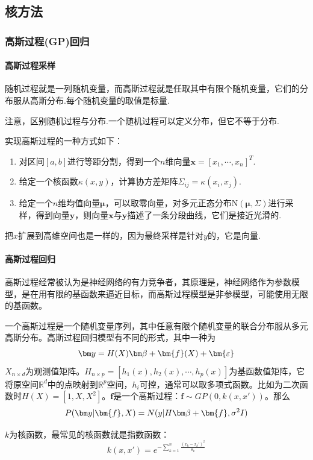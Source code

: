 \subsection{核方法}
\subsubsection{高斯过程(GP)回归}
\paragraph*{高斯过程采样}
随机过程就是一列随机变量，而高斯过程就是任取其中有限个随机变量，它们的分布服从高斯分布.每个随机变量的取值是标量.

注意，区别随机过程与分布.一个随机过程可以定义分布，但它不等于分布.

实现高斯过程的一种方式如下：

\begin{enumerate}
	\item 对区间$[a,b]$进行等距分割，得到一个$n$维向量$\bm{x}=[x_1,\cdots,x_n]^T$.
	\item 给定一个核函数$\kappa(x,y)$，计算协方差矩阵$\Sigma_{ij}=\kappa(x_i,x_j)$.
	\item 给定一个$n$维均值向量$\bm{\mu}$，可以取零向量，对多元正态分布$\text{N}(\bm{\mu},\Sigma)$进行采样，得到向量$\bm{y}$，则向量$\bm{x}$与$\bm{y}$描述了一条分段曲线，它们是接近光滑的.
\end{enumerate}

把$x$扩展到高维空间也是一样的，因为最终采样是针对$y$的，它是向量.


\paragraph*{高斯过程回归}
高斯过程经常被认为是神经网络的有力竞争者，其原理是，神经网络作为参数模型，是在用有限的基函数来逼近目标，而高斯过程模型是非参模型，可能使用无限的基函数。

一个高斯过程是一个随机变量序列，其中任意有限个随机变量的联合分布服从多元高斯分布。高斯过程回归模型有不同的形式，其中一种为
$$\by=H(X)\bbeta+\bm{f}(X)+\bm{\varepsilon}$$
$X_{n\times d}$为观测值矩阵。$H_{n\times p}=[h_1(x),h_2(x),\cdots,h_p(x)]$为基函数值矩阵，它将原空间$\mathbb{R}^d$中的点映射到$\mathbb{R}^p$空间，$h_i$可控，通常可以取多项式函数。比如为二次函数时$H(X)=[1,X,X^2]$。$\bm{f}$是一个高斯过程：$\bm{f}\sim GP(0,k(x,x'))$。那么
$$P(\by | \bm{f},X)=N(y|H\bbeta+\bm{f},\sigma^2 I)$$

$k$为核函数，最常见的核函数就是指数函数：
$$k(x,x')=e^{-\sum_{k=1}^{n}\frac{(x_k-x_k')^2}{\theta_k}}$$

